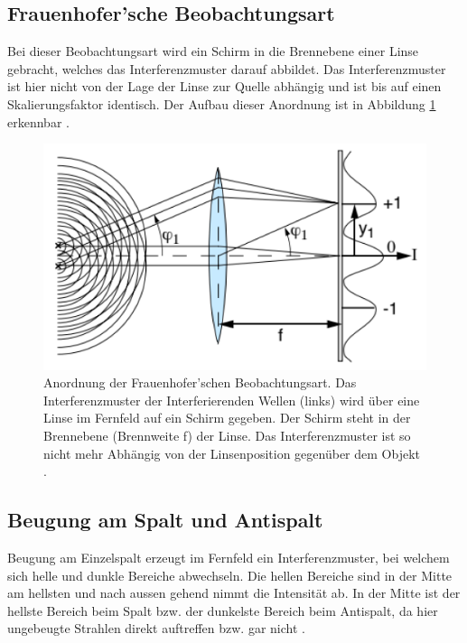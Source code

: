 \subsection{Frauenhofer'sche Beobachtungsart}
Bei dieser Beobachtungsart wird ein Schirm in die Brennebene einer Linse gebracht, welches das Interferenzmuster darauf abbildet. Das Interferenzmuster ist hier nicht von der Lage der Linse zur Quelle abhängig und ist bis auf einen Skalierungsfaktor identisch. Der Aufbau dieser Anordnung ist in Abbildung \ref{fig:Frauenhofer} erkennbar \cite{Angaben2011}.\\
\begin{figure}[h]
\begin{center}
\includegraphics[scale=0.8]{Bilder/Frauenhofer.png}
\end{center}
\caption[Anordnung der Frauenhofer'schen Beobachtungsart]{Anordnung der Frauenhofer'schen Beobachtungsart. Das Interferenzmuster der Interferierenden Wellen (links) wird über eine Linse im Fernfeld auf ein Schirm gegeben. Der Schirm steht in der Brennebene (Brennweite f) der Linse. Das Interferenzmuster ist so nicht mehr Abhängig von der Linsenposition gegenüber dem Objekt \cite{Angaben2011}.}
\label{fig:Frauenhofer}
\end{figure}

\subsection{Beugung am Spalt und Antispalt}
Beugung am Einzelspalt erzeugt im Fernfeld ein Interferenzmuster, bei welchem sich helle und dunkle Bereiche abwechseln. Die hellen Bereiche sind in der Mitte am hellsten und nach aussen gehend nimmt die Intensität ab. In der Mitte ist der hellste Bereich beim Spalt bzw. der dunkelste Bereich beim Antispalt, da hier ungebeugte Strahlen direkt auftreffen bzw. gar nicht \cite{Angaben2011}.\\

